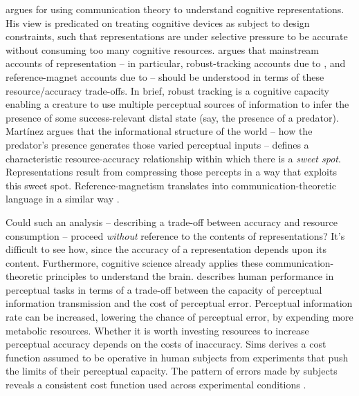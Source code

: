 \documentclass[12pt]{article}
\begin{document}
\citet{martinez2019deception,martinez2019representations} argues for using communication theory to understand cognitive representations.
His view is predicated on treating cognitive devices as subject to design constraints, such that representations are under selective pressure to be accurate without consuming too many cognitive resources.
\citet{martinez2019representations} argues that mainstream accounts of representation -- in particular, robust-tracking accounts due to \citet{sterelny2003thought,burge2010origins}, and reference-magnet accounts due to \citet{ryder2004sinbad,lewis1984putnam} -- should be understood in terms of these resource/accuracy trade-offs.
In brief, robust tracking is a cognitive capacity enabling a creature to use multiple perceptual sources of information to infer the presence of some success-relevant distal state (say, the presence of a predator).
Mart\'{i}nez argues that the informational structure of the world -- how the predator's presence generates those varied perceptual inputs -- defines a characteristic resource-accuracy relationship within which there is a \textit{sweet spot}.
Representations result from compressing those percepts in a way that exploits this sweet spot.
Reference-magnetism translates into communication-theoretic language in a similar way \citep[1223]{martinez2019representations}.

Could such an analysis -- describing a trade-off between accuracy and resource consumption -- proceed \textit{without} reference to the contents of representations?
It's difficult to see how, since the accuracy of a representation depends upon its content.
Furthermore, cognitive science already applies these communication-theoretic principles to understand the brain.
\citet{sims2016ratedistortion} describes human performance in perceptual tasks in terms of a trade-off between the capacity of perceptual information transmission and the cost of perceptual error.
Perceptual information rate can be increased, lowering the chance of perceptual error, by expending more metabolic resources.
Whether it is worth investing resources to increase perceptual accuracy depends on the costs of inaccuracy.
Sims derives a cost function assumed to be operative in human subjects from experiments that push the limits of their perceptual capacity.
The pattern of errors made by subjects reveals a consistent cost function used across experimental conditions \citep[188]{sims2016ratedistortion}.
\end{document}
